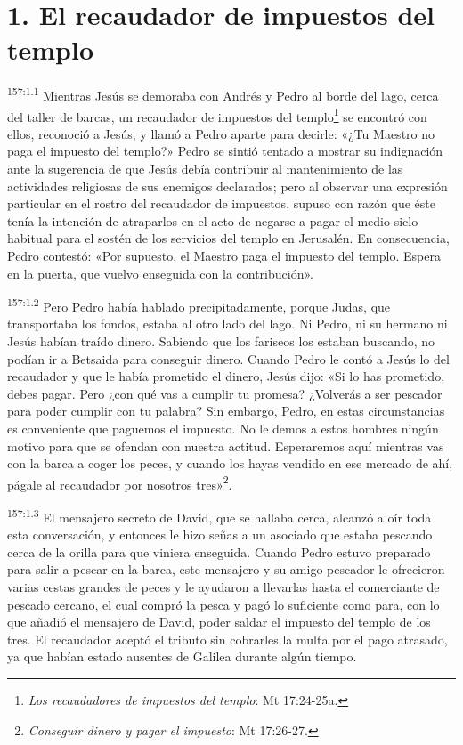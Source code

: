 \section*{1. El recaudador de impuestos del templo}
\par
\textsuperscript{157:1.1} Mientras Jesús se demoraba con Andrés y Pedro al borde del lago, cerca del taller de barcas, un recaudador de impuestos del templo\footnote{\textit{Los recaudadores de impuestos del templo}: Mt 17:24-25a.} se encontró con ellos, reconoció a Jesús, y llamó a Pedro aparte para decirle: «¿Tu Maestro no paga el impuesto del templo?» Pedro se sintió tentado a mostrar su indignación ante la sugerencia de que Jesús debía contribuir al mantenimiento de las actividades religiosas de sus enemigos declarados; pero al observar una expresión particular en el rostro del recaudador de impuestos, supuso con razón que éste tenía la intención de atraparlos en el acto de negarse a pagar el medio siclo habitual para el sostén de los servicios del templo en Jerusalén. En consecuencia, Pedro contestó: «Por supuesto, el Maestro paga el impuesto del templo. Espera en la puerta, que vuelvo enseguida con la contribución».

\par
\textsuperscript{157:1.2} Pero Pedro había hablado precipitadamente, porque Judas, que transportaba los fondos, estaba al otro lado del lago. Ni Pedro, ni su hermano ni Jesús habían traído dinero. Sabiendo que los fariseos los estaban buscando, no podían ir a Betsaida para conseguir dinero. Cuando Pedro le contó a Jesús lo del recaudador y que le había prometido el dinero, Jesús dijo: «Si lo has prometido, debes pagar. Pero ¿con qué vas a cumplir tu promesa? ¿Volverás a ser pescador para poder cumplir con tu palabra? Sin embargo, Pedro, en estas circunstancias es conveniente que paguemos el impuesto. No le demos a estos hombres ningún motivo para que se ofendan con nuestra actitud. Esperaremos aquí mientras vas con la barca a coger los peces, y cuando los hayas vendido en ese mercado de ahí, págale al recaudador por nosotros tres»\footnote{\textit{Conseguir dinero y pagar el impuesto}: Mt 17:26-27.}.

\par
\textsuperscript{157:1.3} El mensajero secreto de David, que se hallaba cerca, alcanzó a oír toda esta conversación, y entonces le hizo señas a un asociado que estaba pescando cerca de la orilla para que viniera enseguida. Cuando Pedro estuvo preparado para salir a pescar en la barca, este mensajero y su amigo pescador le ofrecieron varias cestas grandes de peces y le ayudaron a llevarlas hasta el comerciante de pescado cercano, el cual compró la pesca y pagó lo suficiente como para, con lo que añadió el mensajero de David, poder saldar el impuesto del templo de los tres. El recaudador aceptó el tributo sin cobrarles la multa por el pago atrasado, ya que habían estado ausentes de Galilea durante algún tiempo.

